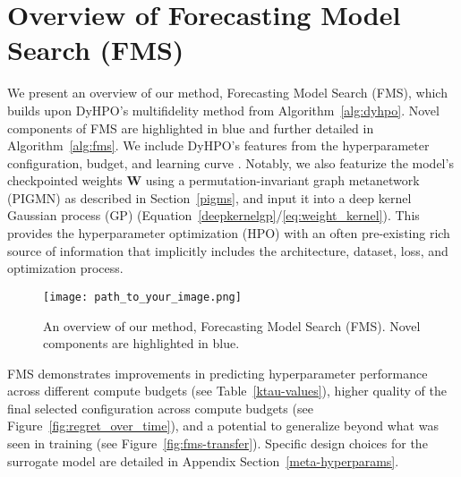 \documentclass{article}
\begin{document}
\section*{Overview of Forecasting Model Search (FMS)}

We present an overview of our method, Forecasting Model Search (FMS), which builds upon DyHPO's multifidelity method from Algorithm~\ref{alg:dyhpo}. Novel components of FMS are highlighted in blue and further detailed in Algorithm~\ref{alg:fms}. We include DyHPO's features from the hyperparameter configuration, budget, and learning curve \cite{wistuba2023supervising}. Notably, we also featurize the model's checkpointed weights $\mathbf{W}$ using a permutation-invariant graph metanetwork (PIGMN) as described in Section~\ref{pigms}, and input it into a deep kernel Gaussian process (GP) (Equation~\ref{deepkernelgp}/\ref{eq:weight_kernel}). This provides the hyperparameter optimization (HPO) with an often pre-existing rich source of information that implicitly includes the architecture, dataset, loss, and optimization process.

\begin{figure}[ht]
    \centering
    \texttt{[image: path\_to\_your\_image.png]}
    \caption{An overview of our method, Forecasting Model Search (FMS). Novel components are highlighted in blue.}
    \label{fig:overview_fms}
\end{figure}

FMS demonstrates improvements in predicting hyperparameter performance across different compute budgets (see Table~\ref{ktau-values}), higher quality of the final selected configuration across compute budgets (see Figure~\ref{fig:regret_over_time}), and a potential to generalize beyond what was seen in training (see Figure~\ref{fig:fms-transfer}). Specific design choices for the surrogate model are detailed in Appendix Section~\ref{meta-hyperparams}.
\end{document}
